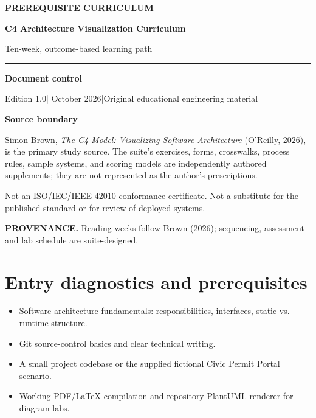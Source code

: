 \documentclass[10pt,letterpaper]{article}
\newcommand{\SourceNote}[1]{\par\smallskip\noindent\colorbox{C4Light}{\parbox{0.94\linewidth}{\footnotesize\textbf{PROVENANCE.} #1}}\par\medskip}
\newcommand{\DocStart}[3]{%
\begin{document}
\begin{titlepage}
\renewcommand{\thepage}{title-\arabic{page}}
\vspace*{0.55in}
{\sffamily\bfseries\small\color{C4Teal}#1}\par\vspace{0.24in}
{\sffamily\bfseries\fontsize{26}{31}\selectfont\color{C4Navy}#2}\par\vspace{0.18in}
{\large\color{C4Gray}#3}\par\vspace{0.4in}
\textcolor{C4Teal}{\rule{\linewidth}{1.15pt}}\par\vspace{0.24in}
\textbf{Document control}\par
Edition 1.0\quad|\quad 30 October 2026\quad|\quad Original educational engineering material\par
\vspace{0.17in}
\textbf{Source boundary}\par
Simon Brown, \emph{The C4 Model: Visualizing Software Architecture} (O'Reilly, 2026), is the primary study source. The suite's exercises, forms, crosswalks, process rules, sample systems, and scoring models are independently authored supplements; they are not represented as the author's prescriptions.\par
\vfill
{\small\color{C4Gray}Not an ISO/IEC/IEEE 42010 conformance certificate. Not a substitute for the published standard or for review of deployed systems.}\par
\end{titlepage}
}
\DocStart{PREREQUISITE CURRICULUM}{C4 Architecture Visualization Curriculum}{Ten-week, outcome-based learning path}
\tableofcontents\clearpage
\SourceNote{Reading weeks follow Brown (2026); sequencing, assessment and lab schedule are suite-designed.}
\section{Entry diagnostics and prerequisites}
\begin{itemize}
\item Software architecture fundamentals: responsibilities, interfaces, static vs. runtime structure.
\item Git source-control basics and clear technical writing.
\item A small project codebase or the supplied fictional Civic Permit Portal scenario.
\item Working PDF/LaTeX compilation and repository PlantUML renderer for diagram labs.
\end{itemize}
\end{document}
